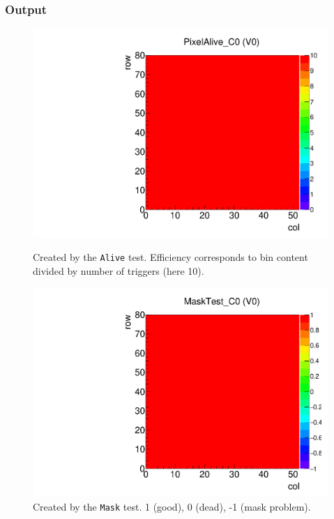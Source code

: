 \subsubsection{Output}

\begin{figure}[!htp]
\centering
\begin{minipage}{0.45\textwidth}
  \includegraphics[width=1.0\textwidth]{figures/alive_PixelAlive.pdf}
  \caption{Created by the {\tt Alive} test. 
  Efficiency corresponds to bin content divided by number of triggers (here 10).}
  \label{fig:alive_PixelAlive}
\end{minipage}
\hspace{0.3cm}
\begin{minipage}{0.45\textwidth}
  \includegraphics[width=1.0\textwidth]{figures/alive_MaskTest.pdf}
  \caption{Created by the {\tt Mask} test.
  1 (good), 0 (dead), -1 (mask problem).}
  \label{fig:alive_MaskTest}
\end{minipage}
\end{figure}

